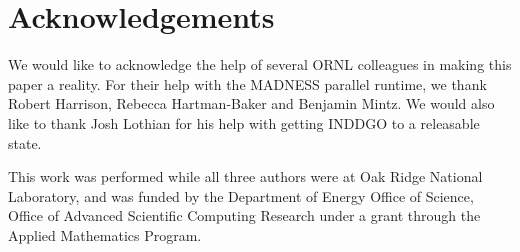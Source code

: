 \documentclass[conference]{IEEEtran}
\begin{document}
\section{Acknowledgements}
We would like to acknowledge the help of several ORNL colleagues in making this paper a reality. For their help with the MADNESS parallel runtime, we thank Robert Harrison, Rebecca Hartman-Baker and Benjamin Mintz. We would also like to thank Josh Lothian for his help with getting INDDGO to a releasable state.

This work was performed while all three authors were at Oak Ridge National Laboratory, and was funded by the Department of Energy Office of Science, Office of Advanced Scientific Computing Research under a grant through the Applied Mathematics Program.
\begin{singlespace}
\small


\end{singlespace}
\end{document}
